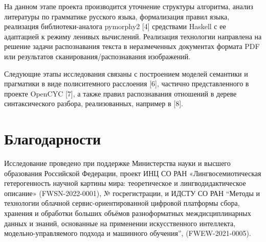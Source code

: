 \documentclass[
]{ceurart}
\begin{document}
На данном этапе проекта производится уточнение структуры алгоритма,
анализ литературы по грамматике русского языка, формализация правил
языка, реализация библиотеки-аналога pymorphy2 {[}4{]} средствами
Haskell с ее адаптацией к режиму ленивых вычислений. Реализация
технологии направлена на решение задачи распознавания текста в
неразмеченных документах формата PDF или результатов
сканирования/распознавания изображений.

Следующие этапы исследования связаны с построением моделей семантики и
прагматики в виде полиситемного расслоения {[}6{]}, частично
представленного в проекте OpenCYC {[}7{]}, а также правил распознавания
отношений в дереве синтаксического разбора, реализованных, например в
{[}8{]}.

\section{Благодарности}

Исследование проведено при поддержке Министерства науки и высшего
образования Российской Федерации, проект ИНЦ СО РАН «Лингвосемиотическая
гетерогенность научной картины мира: теоретическое и лингводидактическое
описание» (FWSN-2022-0001), № госрегистрации, и ИДСТУ СО РАН ``Методы и
технологии облачной сервис-ориентированной цифровой платформы сбора,
хранения и обработки больших объёмов разноформатных междисциплинарных
данных и знаний, основанные на применении искусственного интеллекта,
модельно-управляемого подхода и машинного обучения'', (FWEW-2021-0005).

\end{document}
